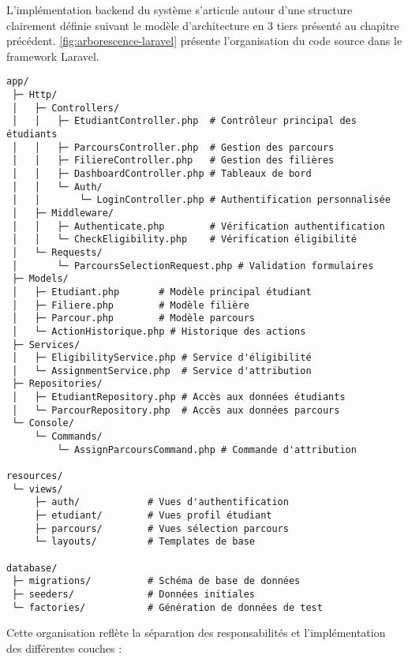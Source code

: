 \documentclass[french,12pt]{report} %
\let\oldfigure\figure
\let\endoldfigure\endfigure
\renewenvironment{figure}[1][H]{
    \oldfigure[#1]\centering
}{
    \endoldfigure
}
\begin{document}
L'implémentation backend du système s'articule autour d'une structure clairement définie suivant le modèle d'architecture en 3 tiers présenté au chapitre précédent. \autoref{fig:arborescence-laravel} présente l'organisation du code source dans le framework Laravel.

\begin{figure}[H]
\centering
\begin{minipage}{0.95\textwidth}
\begin{lstlisting}[style=shell,caption={Arborescence principale du code Laravel}]
app/
 ├─ Http/
 │   ├─ Controllers/
 │   │   ├─ EtudiantController.php  # Contrôleur principal des étudiants
 │   │   ├─ ParcoursController.php  # Gestion des parcours
 │   │   ├─ FiliereController.php   # Gestion des filières
 │   │   ├─ DashboardController.php # Tableaux de bord
 │   │   └─ Auth/
 │   │       └─ LoginController.php # Authentification personnalisée
 │   ├─ Middleware/
 │   │   ├─ Authenticate.php        # Vérification authentification
 │   │   └─ CheckEligibility.php    # Vérification éligibilité
 │   └─ Requests/
 │       └─ ParcoursSelectionRequest.php # Validation formulaires
 ├─ Models/
 │   ├─ Etudiant.php       # Modèle principal étudiant
 │   ├─ Filiere.php        # Modèle filière
 │   ├─ Parcour.php        # Modèle parcours
 │   └─ ActionHistorique.php # Historique des actions
 ├─ Services/
 │   ├─ EligibilityService.php # Service d'éligibilité
 │   └─ AssignmentService.php  # Service d'attribution
 ├─ Repositories/
 │   ├─ EtudiantRepository.php # Accès aux données étudiants
 │   └─ ParcourRepository.php  # Accès aux données parcours
 └─ Console/
     └─ Commands/
         └─ AssignParcoursCommand.php # Commande d'attribution

resources/
 └─ views/
     ├─ auth/            # Vues d'authentification
     ├─ etudiant/        # Vues profil étudiant
     ├─ parcours/        # Vues sélection parcours
     └─ layouts/         # Templates de base

database/
 ├─ migrations/          # Schéma de base de données
 ├─ seeders/             # Données initiales
 └─ factories/           # Génération de données de test
\end{lstlisting}
\end{minipage}
\caption{Structure des répertoires et fichiers du projet Laravel}
\label{fig:arborescence-laravel}
\end{figure}

Cette organisation reflète la séparation des responsabilités et l'implémentation des différentes couches :
\end{document}
